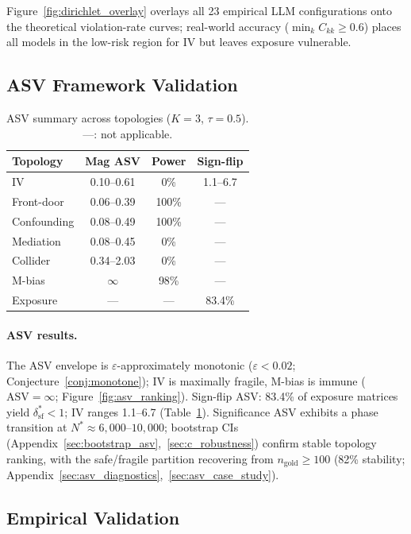 Figure~\ref{fig:dirichlet_overlay} overlays all 23 empirical LLM configurations onto the theoretical violation-rate curves; real-world accuracy ($\min_k C_{kk} \geq 0.6$) places all models in the low-risk region for IV but leaves exposure vulnerable.

\subsection{ASV Framework Validation}
\label{sec:asv_results}

\begin{table}[t]
\centering
\small
\caption{ASV summary across topologies ($K{=}3$, $\tau{=}0.5$). ---: not applicable.}
\label{tab:asv_summary}
\begin{tabular}{lccc}
\toprule
\textbf{Topology} & \textbf{Mag ASV} & \textbf{Power} & \textbf{Sign-flip} \\
\midrule
IV          & 0.10--0.61 & 0\%   & 1.1--6.7 \\
Front-door  & 0.06--0.39 & 100\% & --- \\
Confounding & 0.08--0.49 & 100\% & --- \\
Mediation   & 0.08--0.45 & 0\%   & --- \\
Collider    & 0.34--2.03 & 0\%   & --- \\
M-bias      & $\infty$   & 98\%  & --- \\
Exposure    & ---        & ---   & 83.4\% \\
\bottomrule
\end{tabular}
\end{table}

\paragraph{ASV results.}
The ASV envelope is $\varepsilon$-approximately monotonic ($\varepsilon < 0.02$; Conjecture~\ref{conj:monotone}); IV is maximally fragile, M-bias is immune ($\text{ASV} = \infty$; Figure~\ref{fig:asv_ranking}). Sign-flip ASV: 83.4\% of exposure matrices yield $\delta^*_{\text{sf}} < 1$; IV ranges 1.1--6.7 (Table~\ref{tab:asv_summary}). Significance ASV exhibits a phase transition at $N^* \approx 6{,}000$--$10{,}000$; bootstrap CIs (Appendix~\ref{sec:bootstrap_asv},~\ref{sec:c_robustness}) confirm stable topology ranking, with the safe/fragile partition recovering from $n_{\text{gold}} \geq 100$ (82\% stability; Appendix~\ref{sec:asv_diagnostics},~\ref{sec:asv_case_study}).

\subsection{Empirical Validation}
\label{sec:empirical}

